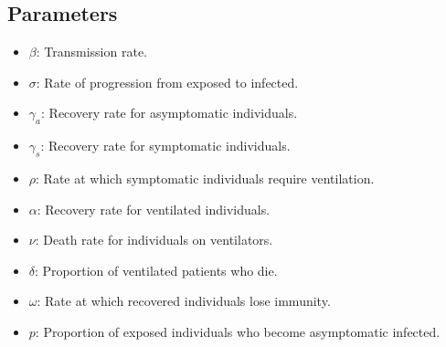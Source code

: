 \documentclass[lettersize, journal]{IEEEtran}
\begin{document}
\subsection{Parameters}
\begin{itemize}
    \item \( \beta \): Transmission rate.
    \item \( \sigma \): Rate of progression from exposed to infected.
    \item \( \gamma_a \): Recovery rate for asymptomatic individuals.
    \item \( \gamma_s \): Recovery rate for symptomatic individuals.
    \item \( \rho \): Rate at which symptomatic individuals require ventilation.
    \item \( \alpha \): Recovery rate for ventilated individuals.
    \item \( \nu \): Death rate for individuals on ventilators.
    \item \( \delta \): Proportion of ventilated patients who die.
    \item \( \omega \): Rate at which recovered individuals lose immunity.
    \item \( p \): Proportion of exposed individuals who become asymptomatic infected.
\end{itemize}
\end{document}
